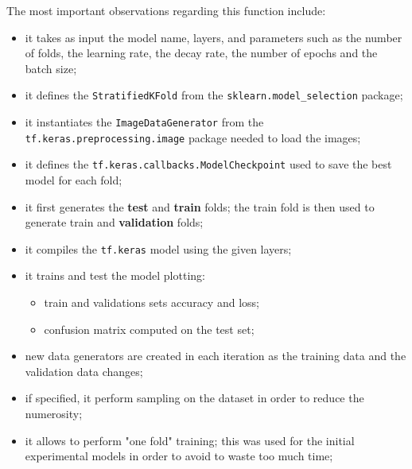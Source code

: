\documentclass[11pt,a4paper]{article}
\begin{document}
The most important observations regarding this function include:
\begin{itemize}
    \item it takes as input the model name, layers, and parameters such as the number of folds, the learning rate, the decay rate, the number of epochs and the batch size;
    \item it defines the \texttt{StratifiedKFold} from the \texttt{sklearn.model\_selection} package;
    \item it instantiates the \texttt{ImageDataGenerator} from the \texttt{tf.keras.preprocessing.image} package needed to load the images;
    \item it defines the \texttt{tf.keras.callbacks.ModelCheckpoint} used to save the best model for each fold;
    \item it first generates the \textbf{test} and \textbf{train} folds; the train fold is then used to generate train and \textbf{validation} folds;
    \item it compiles the \texttt{tf.keras} model using the given layers;
    \item it trains and test the model plotting:
    \begin{itemize}
        \item train and validations sets accuracy and loss;
        \item confusion matrix computed on the test set;
    \end{itemize}
    \item new data generators are created in each iteration as the training data and the validation data changes;
    \item if specified, it perform sampling on the dataset in order to reduce the numerosity;
    \item it allows to perform "one fold" training; this was used for the initial experimental models in order to avoid to waste too much time;
\end{itemize}
\end{document}
